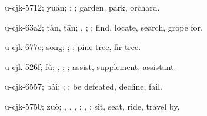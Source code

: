 \begin{multicols}{2}
{\cjkgGlue{}u-cjk-5712; yuán; \cjkgGlue{}; \cjkgGlue{}; garden, park, orchard.

\cjkgGlue{}u-cjk-63a2; tàn, tān; \cjkgGlue{}\cjkgGlue{}\cjkgGlue{}, \cjkgGlue{}\cjkgGlue{}\cjkgGlue{}; \cjkgGlue{}; find, locate, search, grope for.

\cjkgGlue{}u-cjk-677e; sōng; \cjkgGlue{}; \cjkgGlue{}; pine tree, fir tree.

\cjkgGlue{}u-cjk-526f; fù; \cjkgGlue{}, \cjkgGlue{}; \cjkgGlue{}; assist, supplement, assistant.

\cjkgGlue{}u-cjk-6557; bài; \cjkgGlue{}\cjkgGlue{}\cjkgGlue{}; \cjkgGlue{}; be defeated, decline, fail.

\cjkgGlue{}u-cjk-5750; zuò; \cjkgGlue{}\cjkgGlue{}\cjkgGlue{}, \cjkgGlue{}, \cjkgGlue{}, \cjkgGlue{}; \cjkgGlue{}, \cjkgGlue{}; sit, seat, ride, travel by.

}
\end{multicols}
